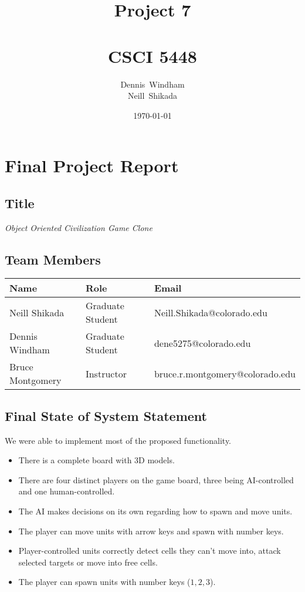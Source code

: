 \documentclass[11pt]{amsart}
\def \fnamea{Dennis}
\def \fnameb{Neill}
\def \lnamea{Windham}
\def \lnameb{Shikada}
\def \class{CSCI 5448}
\def \hwnum{7} %
\def \assgn{Project \hwnum}
\begin{document}
\author[\lnamea]{\fnamea\ \lnamea\\\fnameb\ \lnameb}
\date{\today}
\title[\assgn]{\assgn \\ \ \\\class}
\maketitle
\tableofcontents

\newpage
\section*{\textbf{Final Project Report}}
\subsection*{Title}
\begin{center}
    \textit{Object Oriented Civilization Game Clone}
\end{center}

\subsection*{Team Members} \phantom{}

\begin{table}[htbp]
    \begin{tabularx}{\textwidth}{l|l|l}
        \textbf{Name}    & \textbf{Role}    & \textbf{Email}                  \\
        \hline
        Neill Shikada    & Graduate Student & Neill.Shikada@colorado.edu
        \\
        Dennis Windham   & Graduate Student & dene5275@colorado.edu           \\
        Bruce Montgomery & Instructor       & bruce.r.montgomery@colorado.edu
    \end{tabularx}
\end{table}

\subsection*{Final State of System Statement} \phantom{}

We were able to implement most of the proposed functionality.
\begin{itemize}
    \item There is a complete board with 3D models.
    \item There are four distinct players on the game board, three being AI-controlled and one human-controlled.
    \item The AI makes decisions on its own regarding how to spawn and move units.
    \item The player can move units with arrow keys and spawn with number keys.
    \item Player-controlled units correctly detect cells they can't move into, attack selected targets or move into free cells.
    \item The player can spawn units with number keys ($1,2,3$).
\end{itemize}
\end{document}
